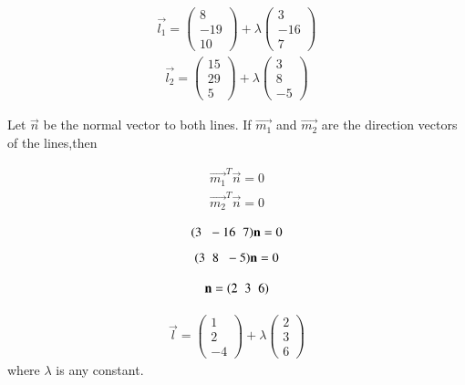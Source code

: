 \documentclass[journal,12pt,twocolumn]{IEEEtran}
\begin{document}
\begin{align}   
	\vec{l_1} =\begin{pmatrix} 8\\ -19\\ 10\end{pmatrix} + \lambda
	\begin{pmatrix} 3 \\-16\\ 7\end{pmatrix} 
\end{align}
\begin{align}   
	\vec{l_2} =\begin{pmatrix}15\\ 29\\ 5\end{pmatrix} + \lambda
	\begin{pmatrix} 3 \\8\\ -5\end{pmatrix} 
\end{align}

\begin{flushleft}
	Let $\vec{n}$ be the normal vector to both lines. If $\vec{m_1}$ and $\vec{m_2}$ are the direction vectors of the lines,then
\end{flushleft}
\begin{align}
 \vec{m_1}^T  \vec{n} = 0   
\end{align}
\begin{align}
\vec{m_2}^T\vec{n} = 0    
\end{align}

\begin{align}   
	(3 \hspace{0.2cm}-16 \hspace{0.2cm}7)\vec{n}  =0
\end{align}
\begin{align}   
	(3 \hspace{0.2cm}  8 \hspace{0.2cm} -5)\vec{n}  =0 
\end{align}

\begin{align}   
	\vec{n} = (2\hspace{0.2cm} 3\hspace{0.2cm} 6) 
\end{align} 

\begin{align}   
   \vec{l} =\begin{pmatrix} 1\\ 2\\ -4\end{pmatrix} + \lambda
   \begin{pmatrix} 2 \\3\\ 6\end{pmatrix} 
\end{align} 
where $\lambda$ is any constant. 
 
\end{document}
